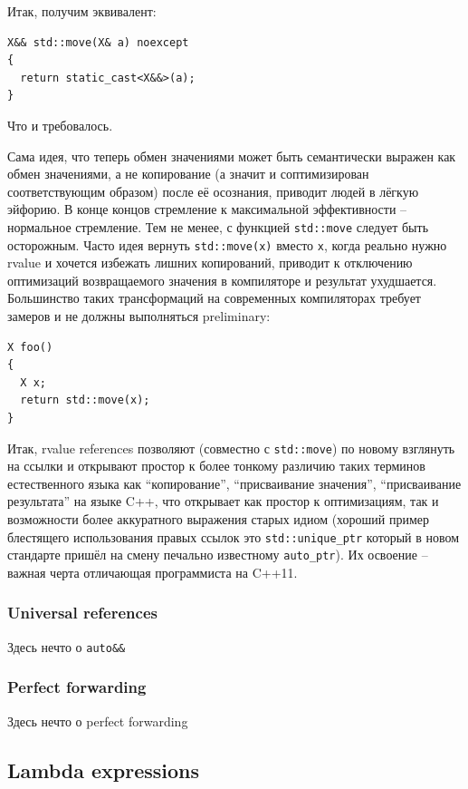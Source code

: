 \documentclass[a4paper,12pt,oneside]{article}
\begin{document}
Итак, получим эквивалент:

\begin{lstlisting}
X&& std::move(X& a) noexcept
{  
  return static_cast<X&&>(a);
}
\end{lstlisting}

Что и требовалось.

Сама идея, что теперь обмен значениями может быть семантически выражен как обмен значениями, а не копирование (а значит и соптимизирован соответствующим образом) после её осознания, приводит людей в лёгкую эйфорию. В конце концов стремление к максимальной эффективности -- нормальное стремление. Тем не менее, с функцией \lstinline!std::move! следует быть осторожным. Часто идея вернуть \lstinline!std::move(x)! вместо \lstinline!x!, когда реально нужно rvalue и хочется избежать лишних копирований, приводит к отключению оптимизаций возвращаемого значения в компиляторе и результат ухудшается. Большинство таких трансформаций на современных компиляторах требует замеров и не должны выполняться preliminary:

\begin{lstlisting}
X foo()
{
  X x;
  return std::move(x);
}
\end{lstlisting}

Итак, rvalue references позволяют (совместно с \lstinline!std::move!) по новому взглянуть на ссылки и открывают простор к более тонкому различию таких терминов естественного языка как ``копирование'', ``присваивание значения'', ``присваивание результата'' на языке C++, что открывает как простор к оптимизациям, так и возможности более аккуратного выражения старых идиом (хороший пример блестящего использования правых ссылок это \lstinline!std::unique_ptr! который в новом стандарте пришёл на смену печально известному \lstinline!auto_ptr!). Их освоение -- важная черта отличающая программиста на C++11.

\subsubsection{Universal references}

Здесь нечто о \lstinline!auto&&!

\subsubsection{Perfect forwarding}

Здесь нечто о perfect forwarding

\subsection{Lambda expressions}
\end{document}
